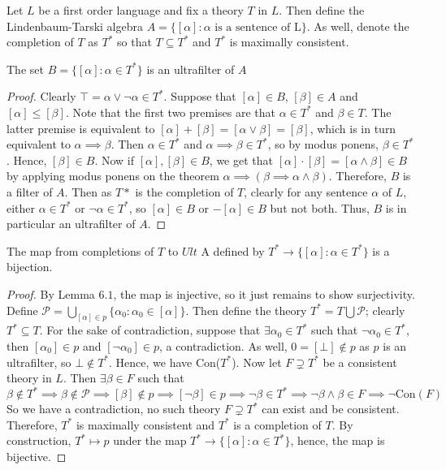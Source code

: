 \documentclass[12pt]{article}
\begin{document}
Let $L$ be a first order language and fix a theory $T$ in $L$. 
Then define the Lindenbaum-Tarski algebra $A=\{[\alpha]:\alpha \text{ is a sentence of L}\}$.
As well, denote the completion of $T$ as $T^*$ so that $T\subseteq T^*$ and $T^*$ is maximally consistent.

\begin{lemma}
The set $B=\{[\alpha]:\alpha\in T^*\}$ is an ultrafilter of $A$
\end{lemma}
\begin{proof}
Clearly $\top=\alpha\vee \neg \alpha\in T^*$.
Suppose that $[\alpha]\in B$, $[\beta] \in A$ and $[\alpha]\le[\beta]$.
Note that the first two premises are that $\alpha\in T^*$ and $\beta \in T$.
The latter premise is equivalent to $[\alpha]+[\beta]=[\alpha\vee\beta]=[\beta]$, which is in turn equivalent to $\alpha\implies\beta$.
Then $\alpha\in T^*$ and $\alpha\implies\beta\in T^*$, so by modus ponens, $\beta\in T^*$.
Hence, $[\beta]\in B$.
Now if $[\alpha],[\beta]\in B$, we get that $[\alpha]\cdot[\beta]=[\alpha\wedge\beta]\in B$ by applying modus ponens on the theorem $\alpha\implies(\beta\implies\alpha\wedge\beta)$.
Therefore, $B$ is a filter of $A$.
Then as $T*$ is the completion of $T$, clearly for any sentence $\alpha$ of $L$, either $\alpha\in T^*$ or $\neg\alpha\in T^*$, so $[\alpha]\in B$ or $-[\alpha]\in B$ but not both.
Thus, $B$ is in particular an ultrafilter of $A$.
\end{proof}

\begin{lemma}
The map from completions of $T$ to $Ult$ A defined by $T^*\to \{[\alpha]:\alpha\in T^*\}$ is a bijection.
\end{lemma}
\begin{proof}
By Lemma $6.1$, the map is injective, so it just remains to show surjectivity.
Define $\mathcal{P}=\bigcup_{[\alpha]\in p} \{\alpha_0:\alpha_0\in [\alpha]\}$.
Then define the theory $T^*=T\bigcup \mathcal{P}$; clearly $T^*\subseteq T$.
For the sake of contradiction, suppose that $\exists \alpha_0\in T^*$ such that $\neg\alpha_0\in T^*$, then $[\alpha_0]\in p$ and $[\neg\alpha_0]\in p$, a contradiction.
As well, $0=[\bot]\not\in p$ as $p$ is an ultrafilter, so $\bot\not\in T^*$.
Hence, we have Con($T^*$).
Now let $F\supsetneq T^*$ be a consistent theory in $L$.
Then $\exists \beta\in F$ such that 
\[
\beta\not\in T^*\implies \beta\not\in \mathcal{P}\implies [\beta]\not\in p\implies [\neg\beta]\in p\implies \neg\beta\in T^*\implies \neg\beta\wedge\beta\in F\implies\neg\text{Con}(F)
\]
So we have a contradiction, no such theory $F\supsetneq T^*$ can exist and be consistent.
Therefore, $T^*$ is maximally consistent and $T^*$ is a completion of $T$.
By construction, $T^*\mapsto p$ under the map $T^*\to \{[\alpha]:\alpha\in T^*\}$, hence, the map is bijective.
\end{proof}
\end{document}

